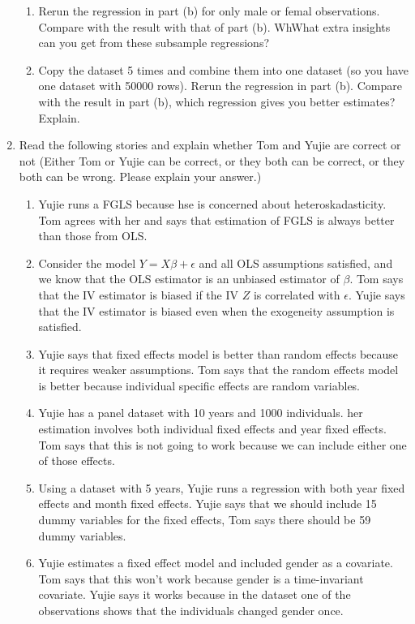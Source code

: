 \documentclass[11pt]{SelfArxOneColBMN}
\begin{document}
\begin{enumerate}
\begin{enumerate}[label=(\alph*)]
    \item Rerun the regression in part (b) for only male or femal observations. Compare with the result with that of part (b). WhWhat extra insights can you get from these subsample regressions?
    \item Copy the dataset 5 times and combine them into one dataset (so you have one dataset with 50000 rows). Rerun the regression in part (b). Compare with the result in part (b), which regression gives you better estimates? Explain.
  \end{enumerate}
  \item Read the following stories and explain whether Tom and Yujie are correct or not (Either Tom or Yujie can be correct, or they both can be correct, or they both can be wrong. Please explain your answer.)
  \begin{enumerate}
    \item Yujie runs a FGLS because hse is concerned about heteroskadasticity. Tom agrees with her and says that estimation of FGLS is always better than those from OLS.
    \item Consider the model $Y = X\beta + \epsilon$ and all OLS assumptions satisfied, and we know that the OLS estimator is an unbiased estimator of $\beta$. Tom says that the IV estimator is biased if the IV $Z$ is correlated with $\epsilon$. Yujie says that the IV estimator is biased even when the exogeneity assumption is satisfied.
    \item Yujie says that fixed effects model is better than random effects because it requires weaker assumptions. Tom says that the random effects model is better because individual specific effects are random variables.
    \item Yujie has a panel dataset with 10 years and 1000 individuals. her estimation involves both individual fixed effects and year fixed effects. Tom says that this is not going to work because we can include either one of those effects.
    \item Using a dataset with 5 years, Yujie runs a regression with both year fixed effects and month fixed effects. Yujie says that we should include 15 dummy variables for the fixed effects, Tom says there should be 59 dummy variables.
    \item Yujie estimates a fixed effect model and included gender as a covariate. Tom says that this won't work because gender is a time-invariant covariate. Yujie says it works because in the dataset one of the observations shows that the individuals changed gender once.
  \end{enumerate}
\end{enumerate}
\end{document}
